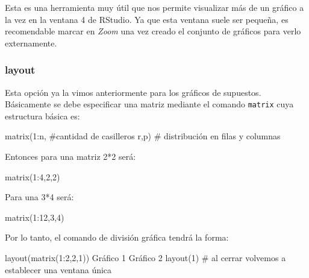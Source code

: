 \documentclass[
  letterpaper,
  DIV=11,
  numbers=noendperiod]{scrartcl}
\newenvironment{Shaded}{\begin{snugshade}}{\end{snugshade}}
\newcommand{\CommentTok}[1]{\textcolor[rgb]{0.37,0.37,0.37}{#1}}
\newcommand{\DecValTok}[1]{\textcolor[rgb]{0.68,0.00,0.00}{#1}}
\newcommand{\FunctionTok}[1]{\textcolor[rgb]{0.28,0.35,0.67}{#1}}
\newcommand{\NormalTok}[1]{\textcolor[rgb]{0.00,0.23,0.31}{#1}}
\newcommand{\SpecialCharTok}[1]{\textcolor[rgb]{0.37,0.37,0.37}{#1}}
\begin{document}
Esta es una herramienta muy útil que nos permite visualizar más de un
gráfico a la vez en la ventana 4 de RStudio. Ya que esta ventana suele
ser pequeña, es recomendable marcar en \emph{Zoom} una vez creado el
conjunto de gráficos para verlo externamente.

\hypertarget{layout}{%
\subsubsection{layout}\label{layout}}

Esta opción ya la vimos anteriormente para los gráficos de supuestos.
Básicamente se debe especificar una matriz mediante el comando
\texttt{matrix} cuya estructura básica es:

\begin{Shaded}
\begin{Highlighting}[]
\FunctionTok{matrix}\NormalTok{(}\DecValTok{1}\SpecialCharTok{:}\NormalTok{n, }\CommentTok{\#cantidad de casilleros}
\NormalTok{       r,p) }\CommentTok{\# distribución en filas y columnas}
\end{Highlighting}
\end{Shaded}

Entonces para una matriz 2*2 será:

\begin{Shaded}
\begin{Highlighting}[]
\FunctionTok{matrix}\NormalTok{(}\DecValTok{1}\SpecialCharTok{:}\DecValTok{4}\NormalTok{,}\DecValTok{2}\NormalTok{,}\DecValTok{2}\NormalTok{)}
\end{Highlighting}
\end{Shaded}

Para una 3*4 será:

\begin{Shaded}
\begin{Highlighting}[]
\FunctionTok{matrix}\NormalTok{(}\DecValTok{1}\SpecialCharTok{:}\DecValTok{12}\NormalTok{,}\DecValTok{3}\NormalTok{,}\DecValTok{4}\NormalTok{)}
\end{Highlighting}
\end{Shaded}

Por lo tanto, el comando de división gráfica tendrá la forma:

\begin{Shaded}
\begin{Highlighting}[]
\FunctionTok{layout}\NormalTok{(}\FunctionTok{matrix}\NormalTok{(}\DecValTok{1}\SpecialCharTok{:}\DecValTok{2}\NormalTok{,}\DecValTok{2}\NormalTok{,}\DecValTok{1}\NormalTok{))}
\NormalTok{Gráfico }\DecValTok{1}
\NormalTok{Gráfico }\DecValTok{2}
\FunctionTok{layout}\NormalTok{(}\DecValTok{1}\NormalTok{) }\CommentTok{\# al cerrar volvemos a establecer una ventana única}
\end{Highlighting}
\end{Shaded}
\end{document}
